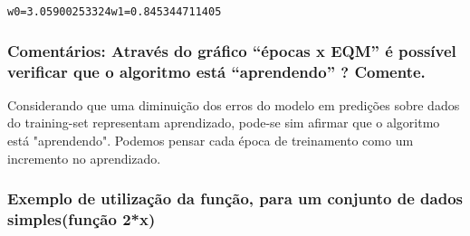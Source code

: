 \documentclass[letterpaper,10pt,english]{/usr/local/lib/python2.7/dist-packages/sphinx/texinputs/sphinxhowto}
\newenvironment{InvisibleVerbatim}
        {\begin{mdframed}[leftmargin=0.1\linewidth,innerleftmargin=3pt,innerrightmargin=3pt, userdefinedwidth=1\linewidth, linewidth=0pt, linecolor=white, usetwoside=false]}
        {\end{mdframed}}
\begin{document}
    

        
        

            
                \begin{InvisibleVerbatim}
                \vspace{-0.5\baselineskip}
\begin{alltt}w0 = 3.05900253324 w1 = 0.845344711405
\end{alltt}

            \end{InvisibleVerbatim}
            
        
    
\subsubsection{Comentários: Através do gráfico ``épocas x EQM'' é possível verificar
que o algoritmo está ``aprendendo'' ? Comente.}
Considerando que uma diminuição dos erros do modelo em predições sobre
dados do training-set representam aprendizado, pode-se sim afirmar que
o  algoritmo está "aprendendo".
Podemos pensar cada época de treinamento como um incremento no
aprendizado.
\subsubsection{Exemplo de utilização da função, para um conjunto de dados
simples(função 2*x)}

\end{document}
